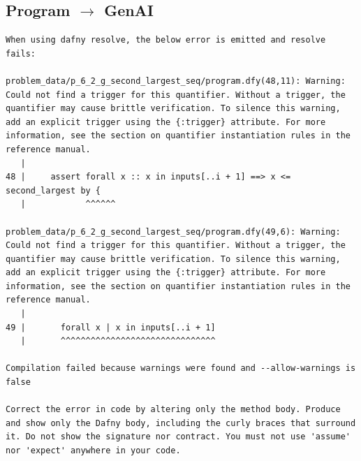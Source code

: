\documentclass{article}
\begin{document}
\subsection*{Program $\rightarrow$ GenAI}
\begin{lstlisting}
When using dafny resolve, the below error is emitted and resolve fails:

problem_data/p_6_2_g_second_largest_seq/program.dfy(48,11): Warning: Could not find a trigger for this quantifier. Without a trigger, the quantifier may cause brittle verification. To silence this warning, add an explicit trigger using the {:trigger} attribute. For more information, see the section on quantifier instantiation rules in the reference manual.
   |
48 |     assert forall x :: x in inputs[..i + 1] ==> x <= second_largest by {
   |            ^^^^^^

problem_data/p_6_2_g_second_largest_seq/program.dfy(49,6): Warning: Could not find a trigger for this quantifier. Without a trigger, the quantifier may cause brittle verification. To silence this warning, add an explicit trigger using the {:trigger} attribute. For more information, see the section on quantifier instantiation rules in the reference manual.
   |
49 |       forall x | x in inputs[..i + 1]
   |       ^^^^^^^^^^^^^^^^^^^^^^^^^^^^^^^

Compilation failed because warnings were found and --allow-warnings is false

Correct the error in code by altering only the method body. Produce and show only the Dafny body, including the curly braces that surround it. Do not show the signature nor contract. You must not use 'assume' nor 'expect' anywhere in your code.
\end{lstlisting}
\end{document}
